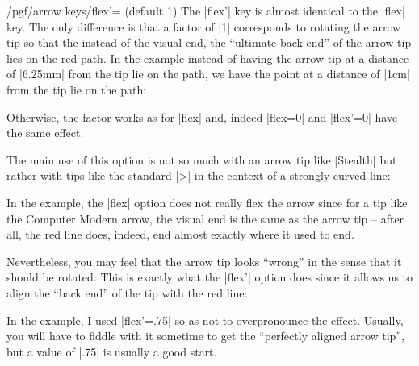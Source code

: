 \begin{key}{/pgf/arrow keys/flex'= (default 1)}
    The |flex'| key is almost identical to the |flex| key. The only difference
    is that a factor of |1| corresponds to rotating the arrow tip so that the
    instead of the visual end, the ``ultimate back end'' of the arrow tip lies
    on the red path. In the example instead of having the arrow tip at a
    distance of |6.25mm| from the tip lie on the path, we have the point at a
    distance of |1cm| from the tip lie on the path:
\begin{codeexample}[preamble={\usetikzlibrary{arrows.meta,bending}}]
\end{codeexample}
    Otherwise, the factor works as for |flex| and, indeed |flex=0| and
    |flex'=0| have the same effect.

    The main use of this option is not so much with an arrow tip like |Stealth|
    but rather with tips like the standard |>| in the context of a strongly
    curved line:
\begin{codeexample}[preamble={\usetikzlibrary{arrows.meta,bending}}]
\end{codeexample}
    In the example, the |flex| option does not really flex the arrow since for
    a tip like the Computer Modern arrow, the visual end is the same as the
    arrow tip -- after all, the red line does, indeed, end almost exactly where
    it used to end.

    Nevertheless, you may feel that the arrow tip looks ``wrong'' in the sense
    that it should be rotated. This is exactly what the |flex'| option does
    since it allows us to align the ``back end'' of the tip with the red line:
\begin{codeexample}[preamble={\usetikzlibrary{arrows.meta,bending}}]
\end{codeexample}
    In the example, I used |flex'=.75| so as not to overpronounce the effect.
    Usually, you will have to fiddle with it sometime to get the ``perfectly
    aligned arrow tip'', but a value of |.75| is usually a good start.
\end{key}

